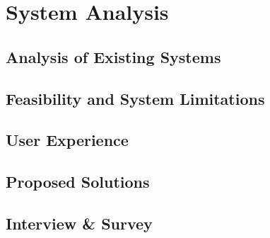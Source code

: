 \section {System Analysis}

\subsection {Analysis of Existing Systems}

\subsection{Feasibility and System Limitations}

\subsection{User Experience}

\subsection{Proposed Solutions}

\subsection{Interview \& Survey}
